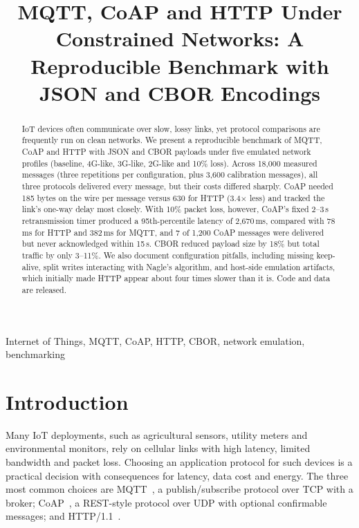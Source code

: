 \documentclass[conference]{IEEEtran}
\begin{document}
\title{MQTT, CoAP and HTTP Under Constrained Networks: A Reproducible Benchmark with JSON and CBOR Encodings}

\author{
}

\maketitle

\begin{abstract}
IoT devices often communicate over slow, lossy links, yet protocol comparisons are frequently run on clean networks. We present a reproducible benchmark of MQTT, CoAP and HTTP with JSON and CBOR payloads under five emulated network profiles (baseline, 4G-like, 3G-like, 2G-like and 10\% loss). Across 18,000 measured messages (three repetitions per configuration, plus 3,600 calibration messages), all three protocols delivered every message, but their costs differed sharply. CoAP needed 185 bytes on the wire per message versus 630 for HTTP (3.4$\times$ less) and tracked the link's one-way delay most closely. With 10\% packet loss, however, CoAP's fixed 2--3\,s retransmission timer produced a 95th-percentile latency of 2{,}670\,ms, compared with 78\,ms for HTTP and 382\,ms for MQTT, and 7 of 1,200 CoAP messages were delivered but never acknowledged within 15\,s. CBOR reduced payload size by 18\% but total traffic by only 3--11\%. We also document configuration pitfalls, including missing keep-alive, split writes interacting with Nagle's algorithm, and host-side emulation artifacts, which initially made HTTP appear about four times slower than it is. Code and data are released.
\end{abstract}

\begin{IEEEkeywords}
Internet of Things, MQTT, CoAP, HTTP, CBOR, network emulation, benchmarking
\end{IEEEkeywords}

\section{Introduction}
Many IoT deployments, such as agricultural sensors, utility meters and environmental monitors, rely on cellular links with high latency, limited bandwidth and packet loss. Choosing an application protocol for such devices is a practical decision with consequences for latency, data cost and energy. The three most common choices are MQTT~\cite{mqtt311}, a publish/subscribe protocol over TCP with a broker; CoAP~\cite{rfc7252}, a REST-style protocol over UDP with optional confirmable messages; and HTTP/1.1~\cite{rfc9112}.
\end{document}
